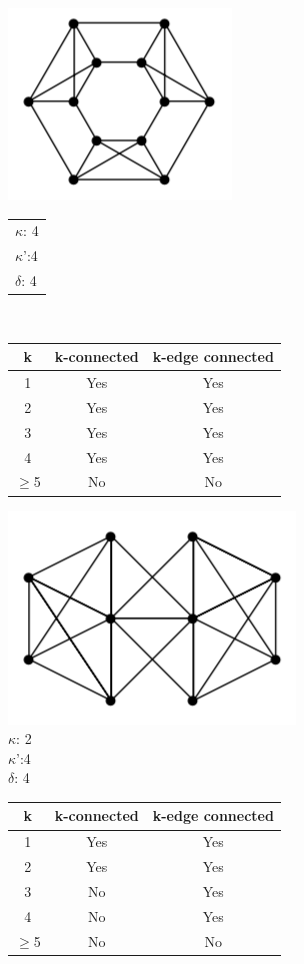 \documentclass[12pt]{article}
\begin{document}
\begin{center}
\includegraphics[scale=.65]{hexagon}

\begin{tabular}{l}
$\kappa$: 4 \\
$\kappa$':4 \\
$\delta$: 4 \\

\end{tabular} \\
\begin{tabular}{|c|c|c|}\hline
k & k-connected & k-edge connected \\ \hline
1 & Yes & Yes \\ \hline
2 & Yes & Yes \\ \hline
3 & Yes & Yes \\ \hline
4 & Yes & Yes \\ \hline
$\geq$5 & No & No \\ \hline
\end{tabular}



\clearpage
\includegraphics[scale=.65]{bigOne}\\

$\kappa$: 2 \\
$\kappa$':4 \\
$\delta$: 4 \\

\begin{tabular}{|c|c|c|}\hline
k & k-connected & k-edge connected \\ \hline
1 & Yes & Yes \\ \hline
2 & Yes & Yes \\ \hline
3 & No & Yes \\ \hline
4 & No & Yes \\ \hline
$\geq$5 & No & No \\ \hline
\end{tabular}

\end{center}
\end{document}

